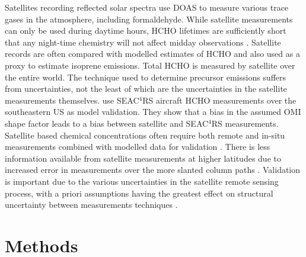     
    Satellites recording reflected solar spectra use DOAS to measure various trace gases in the atmosphere, including formaldehyde. 
    While satellite measurements can only be used during daytime hours, HCHO lifetimes are sufficiently short that any night-time chemistry will not affect midday observations \parencite{Wolfe2016}.
    Satellite records are often compared with modelled estimates of HCHO and also used as a proxy to estimate isoprene emissions.
    Total HCHO is measured by satellite over the entire world.
    The technique used to determine precursor emissions suffers from uncertainties, not the least of which are the uncertainties in the satellite measurements themselves.
    \textcite{Zhu2016} use SEAC$^4$RS aircraft HCHO measurements over the southeastern US as model validation. 
    They show that a bias in the assumed OMI shape factor leads to a bias between satellite and SEAC$^4$RS measurements.
    Satellite based chemical concentrations often require both remote and in-situ measurements combined with modelled data for validation \parencite{Marais2014}.
    There is less information available from satellite measurements at higher latitudes due to increased error in measurements over the more slanted column paths \parencite{DeSmedt2015}.
    Validation is important due to the various uncertainties in the satellite remote sensing process, with a priori assumptions having the greatest effect on structural uncertainty between measurements techniques \textcite{Lorente2017}.
    
    
    
\section{Methods}
  \label{BioIsop:Method}
  
